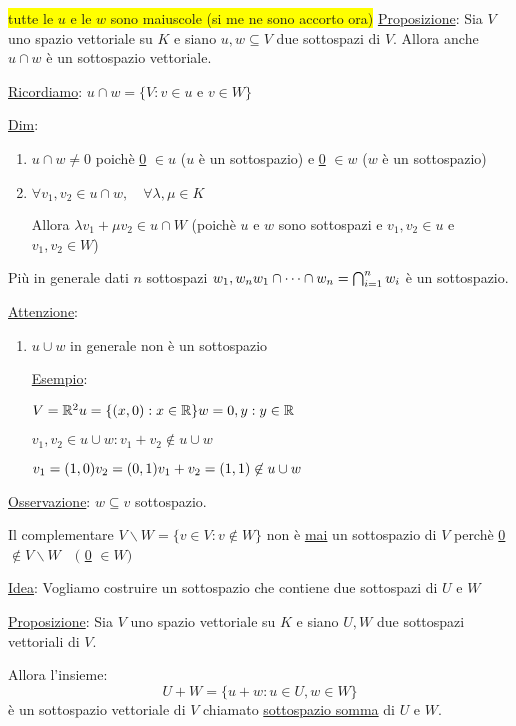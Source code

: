 \documentclass{article}
\newcommand{\hl}[1]{\colorbox{yellow}{#1}}
\newcommand{\ul}[1]{\underline{#1}}
\newcommand{\R}{\mathbb{R}}
\begin{document}
\hl{tutte le $u$ e le $w$ sono maiuscole (si me ne sono accorto ora)}
\ul{Proposizione}: Sia $V$ uno spazio vettoriale su $K$ e siano $u,w\subseteq V$ due sottospazi di $V$. Allora anche $u\cap w$ è un sottospazio vettoriale.

\ul{Ricordiamo}: $u\cap w=\{V:v\in u$ e $v\in W\}$

\ul{Dim}:
\begin{enumerate}
	\item $u\cap w\not=0$ poichè \ul{0} $\in u$ ($u$ è un sottospazio) e \ul{0} $\in w$ ($w$ è un sottospazio)
	\item $\forall v_1,v_2\in u\cap w,\quad\forall\lambda,\mu\in K$

	      Allora $\lambda v_1+\mu v_2\in u\cap W$ (poichè $u$ e $w$ sono sottospazi e $v_1,v_2\in u$ e $v_1,v_2\in W$)
\end{enumerate}

Più in generale dati $n$ sottospazi $w_1,w_n\\w_1\cap\cdots\cap w_n=\bigcap^n_{i=1}w_i$ è un sottospazio.

\ul{Attenzione}:
\begin{enumerate}
	\item $u\cup w$ in generale non è un sottospazio

	      \ul{Esempio}:

	      $V=\R^2\\u=\{(x,0):x\in\R\}\\w={0,y}:y\in\R$

	      $v_1,v_2\in u\cup w:v_1+v_2\not\in u\cup w$

	      $v_1=(1,0)\\v_2=(0,1)\\v_1+v_2=(1,1)\not\in u\cup w$
\end{enumerate}

\ul{Osservazione}: $w\subseteq v$ sottospazio.

Il complementare $V\backslash W=\{v\in V:v\not\in W\}$ non è \ul{mai} un sottospazio di $V$ perchè \ul{0} $\not\in V\backslash W\quad($ \ul{0} $\in W)$

\ul{Idea}: Vogliamo costruire un sottospazio che contiene due sottospazi di $U$ e $W$

\ul{Proposizione}: Sia $V$ uno spazio vettoriale su $K$ e siano $U,W$ due sottospazi vettoriali di $V$.

Allora l'insieme:
$$U+W=\{u+w:u\in U,w\in W\}$$
è un sottospazio vettoriale di $V$ chiamato \ul{sottospazio somma} di $U$ e $W$.
\end{document}
